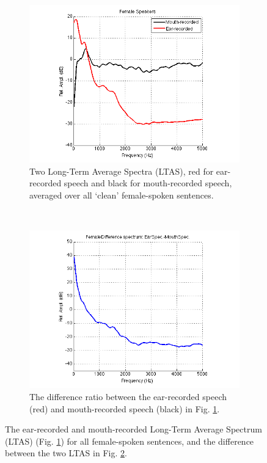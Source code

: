 \begin{figure}[H]
\centering
\begin{subfigure}{\textwidth} %
  \centering
  \includegraphics[width=0.75\linewidth]{figure/female_LTAS.png}
  \caption{Two Long-Term Average Spectra (LTAS), red for ear-recorded speech and black for mouth-recorded speech, averaged over all `clean' female-spoken sentences.}
  \label{female_LTAS}
\end{subfigure}%
\\[2ex]
\begin{subfigure}{\textwidth}
  \centering
  \includegraphics[width=0.75\linewidth]{figure/female_rel_dB.png}
  \caption{The difference ratio between the ear-recorded speech (red) and mouth-recorded speech (black) in Fig. \ref{female_LTAS}.}
  \label{female_rel_dB}
\end{subfigure}
\caption{The ear-recorded and mouth-recorded Long-Term Average Spectrum (LTAS) (Fig. \ref{female_LTAS}) for all female-spoken sentences, and the difference between the two LTAS in Fig. \ref{female_rel_dB}.}
\label{fig:female_LTAS}
\end{figure}

